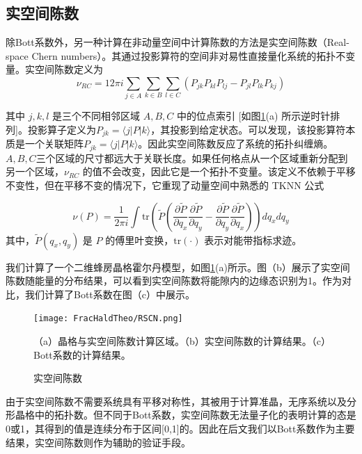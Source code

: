 \subsection{实空间陈数}
除Bott系数外，另一种计算在非动量空间中计算陈数的方法是实空间陈数（Real-space Chern numbers）\cite{kitaev2006anyons,mitchell2018amorphous}。其通过投影算符的空间非对易性直接量化系统的拓扑不变量。实空间陈数定义为
\begin{equation}
\nu_{RC} = 12\pi i \sum_{j\in A} \sum_{k\in B} \sum_{l\in C} (P_{jk} P_{kl} P_{lj} - P_{jl} P_{lk} P_{kj})
\end{equation}

其中 \( j, k, l \) 是三个不同相邻区域 \( A, B, C \) 中的位点索引 [如图\ref{fig:RSCN}(a) 所示逆时针排列]。投影算子定义为\( P_{jk} = \langle j|P|k \rangle \)，其投影到给定状态。可以发现，该投影算符本质是一个关联矩阵$P_{jk} = \langle j|P|k \rangle$。因此实空间陈数反应了系统的拓扑纠缠熵\cite{kitaev2006topological,levin2006detecting,li2008entanglement,fan2023generalized}。\( A, B, C \)三个区域的尺寸都远大于关联长度。如果任何格点从一个区域重新分配到另一个区域，$\nu_{RC}$ 的值不会改变，因此它是一个拓扑不变量。该定义不依赖于平移不变性，但在平移不变的情况下，它重现了动量空间中熟悉的 TKNN 公式\cite{thouless1982quantized}

\begin{equation}
\nu(P) = \frac{1}{2\pi i} \int \text{tr} \left( \tilde{P} \left( \frac{\partial \tilde{P}}{\partial q_x} \frac{\partial \tilde{P}}{\partial q_y} - \frac{\partial \tilde{P}}{\partial q_y} \frac{\partial \tilde{P}}{\partial q_x} \right) \right) dq_x dq_y
\end{equation}
其中，\(\tilde{P}(q_x, q_y)\) 是 \(P\) 的傅里叶变换，\(\text{tr}(\cdot)\) 表示对能带指标求迹。

我们计算了一个二维蜂房晶格霍尔丹模型，如图\ref{fig:RSCN}(a)所示。图（b）展示了实空间陈数随能量的分布结果，可以看到实空间陈数将能隙内的边缘态识别为1。作为对比，我们计算了Bott系数在图（c）中展示。
\begin{figure}[htbp]
    \centering
    \texttt{[image: FracHaldTheo/RSCN.png]}
    \caption{实空间陈数}（a）晶格与实空间陈数计算区域。（b）实空间陈数的计算结果。（c）Bott系数的计算结果。
    \label{fig:RSCN}
\end{figure}
由于实空间陈数不需要系统具有平移对称性，其被用于计算准晶\cite{mitchell2018amorphous}，无序系统以及分形晶格\cite{yang2020photonic}中的拓扑数。但不同于Bott系数，实空间陈数无法量子化的表明计算的态是0或1，其得到的值是连续分布于区间[0,1]的。因此在后文我们以Bott系数作为主要结果，实空间陈数则作为辅助的验证手段。

